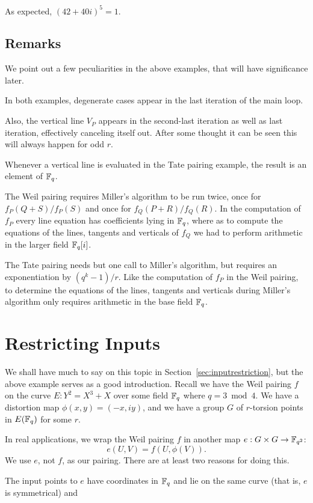 As expected, $(42 + 40i)^5 = 1$.

\subsection {Remarks}
We point out a few peculiarities in the above examples, that will
have significance later.

In both examples,
degenerate cases appear in the last iteration
of the main loop.

Also, the vertical line $V_P$ appears
in the second-last iteration as well as last iteration, effectively canceling
itself out. After some thought it can be seen this will always happen
for odd $r$.

Whenever a vertical line is evaluated in the Tate pairing
example, the result is an element of $\mathbb{F}_q$.

The Weil pairing requires Miller's algorithm to be run twice, once for
$f_P(Q+S) / f_P(S)$ and once for $f_Q(P+R)/f_Q(R)$. In the computation
of $f_P$ every line equation has coefficients lying in $\mathbb{F}_q$, where
as to compute the equations of the lines, tangents and verticals of $f_Q$
we had to perform arithmetic in the larger field $\mathbb{F}_q[i]$.

The Tate pairing needs but one call to Miller's algorithm,
but requires an exponentiation by $(q^k - 1)/r$. Like the computation
of $f_P$ in the Weil pairing, to determine the equations of the lines,
tangents and verticals during Miller's algorithm only requires arithmetic
in the base field $\mathbb{F}_q$.

\section {Restricting Inputs}

We shall have much to say on this topic in Section~\ref{sec:inputrestriction},
but the above example serves as a good introduction.
Recall we have the Weil pairing $f$ on
the curve $E : Y^2 = X^3 + X$ over some field $\mathbb{F}_q$
where $q = 3 \bmod 4$. We have a distortion
map $\phi(x,y) = (-x, i y)$, and we have
a group $G$ of $r$-torsion points in $E(\mathbb{F}_q)$ for some $r$.

In real applications, we wrap the Weil pairing $f$ in another map
$e : G\times G \rightarrow \mathbb{F}_{q^2}$:
\[ e(U, V) = f(U, \phi(V)) . \]
We use $e$, not $f$, as our pairing.
There are at least two reasons for doing this.

The input points to $e$ have coordinates in $\mathbb{F}_q$ and lie on the
same curve (that is, $e$ is symmetrical) and


